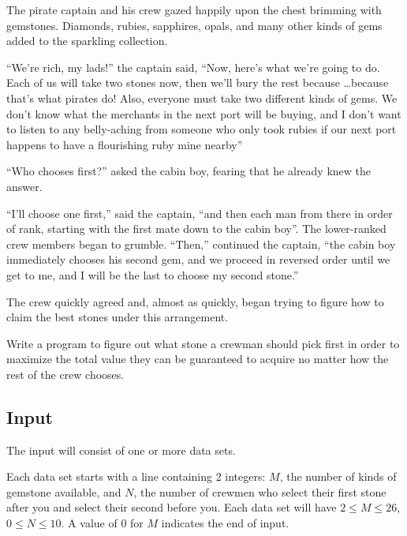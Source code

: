 

The pirate captain and his crew gazed happily upon the chest brimming
with gemstones. Diamonds, rubies, sapphires, opals, and many other
kinds of gems added to the sparkling collection.

``We're rich, my lads!'' the captain said, ``Now, here's what we're
going to do. Each of us will take two stones now, then we'll bury the
rest because \ldots  because that's what pirates do!  Also, everyone
must take two different kinds of gems. We don't know what the merchants
in the next port will be buying, and I don't want to listen to any
belly-aching from someone who only took rubies if our next port
happens to have a flourishing ruby mine nearby''

``Who chooses first?'' asked the cabin boy, fearing that he already
knew the answer.

``I'll choose one first,'' said the captain, ``and then each man from
there in order of rank, starting with the first mate down to the cabin
boy''. The lower-ranked crew members began to grumble. ``Then,''
continued the captain, ``the cabin boy immediately chooses his second
gem, and we proceed in reversed order until we get to me, and I will
be the last to choose my second stone.''

The crew quickly agreed and, almost as quickly, began trying to figure
how to claim the best stones under this arrangement.

Write a program to figure out what stone a crewman should pick first
in order to maximize the total value they can be guaranteed to acquire
no matter how the rest of the crew chooses.


\subsection*{Input}

The input will consist of one or more data sets.

Each data set starts with a line containing 2 integers: $M$, the
number of kinds of gemstone available, and $N$, the number of crewmen
who select their first stone after you and select their second before
you.  Each data set will have $2 \leq M \leq 26$, $0 \leq N \leq 10$.
A value of 0 for $M$ indicates the end of input.

